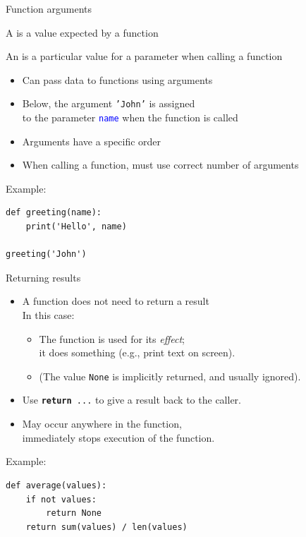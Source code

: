 \documentclass[aspectratio=169,usenames,dvipsnames]{beamer}
\begin{document}
\begin{frame}[fragile]{Function arguments}
    \begin{definition}
        A  is a value expected by a function

        An  is a particular value for a parameter
            when calling a function
    \end{definition}

    \begin{itemize}
        \item Can pass data to functions using arguments
        \item Below, the argument \textcolor{mauve}{\texttt{'John'}} is assigned \\
            to the parameter \textcolor{blue}{\texttt{name}} when the function is called
        \item Arguments have a specific order
        \item When calling a function, must use correct number of arguments
    \end{itemize}
Example:
\begin{lstlisting}
def greeting(name):
    print('Hello', name)

greeting('John')
\end{lstlisting}
\end{frame}

\begin{frame}[fragile]{Returning results}
    \begin{itemize}
        \item A function does not need to return a result \\
            In this case:
            \begin{itemize}
                \item The function is used for its \emph{effect};\\
                    it does something (e.g., print text on screen).
                \item (The value \texttt{None} is implicitly returned,
                        and usually ignored).
            \end{itemize}
        \item Use \texttt{\textbf{\textcolor{OliveGreen}{return}} ...}
            to give a result back to the caller.
        \item May occur anywhere in the function,\\
                immediately stops execution of the function.
    \end{itemize}

Example:
\begin{lstlisting}
def average(values):
    if not values:
        return None
    return sum(values) / len(values)
\end{lstlisting}
\end{frame}
\end{document}

